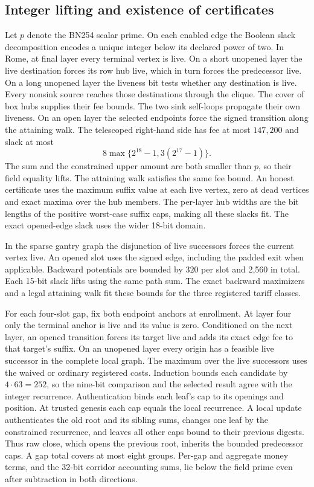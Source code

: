 \subsection{Integer lifting and existence of certificates}
Let $p$ denote the BN254 scalar prime. On each enabled edge the Boolean slack decomposition encodes a unique integer below its declared power of two. In Rome, at final layer every terminal vertex is live. On a short unopened layer the live destination forces its row hub live, which in turn forces the predecessor live. On a long unopened layer the liveness bit tests whether any destination is live. Every nonsink source reaches those destinations through the clique. The cover of box hubs supplies their fee bounds. The two sink self-loops propagate their own liveness. On an open layer the selected endpoints force the signed transition along the attaining walk. The telescoped right-hand side has fee at most $147{,}200$ and slack at most
\[
8\max\{2^{18}-1,3(2^{17}-1)\}.
\]
The sum and the constrained upper amount are both smaller than $p$, so their field equality lifts. The attaining walk satisfies the same fee bound. An honest certificate uses the maximum suffix value at each live vertex, zero at dead vertices and exact maxima over the hub members. The per-layer hub widths are the bit lengths of the positive worst-case suffix caps, making all these slacks fit. The exact opened-edge slack uses the wider 18-bit domain.

In the sparse gantry graph the disjunction of live successors forces the current vertex live. An opened slot uses the signed edge, including the padded exit when applicable. Backward potentials are bounded by $320$ per slot and 2,560 in total. Each 15-bit slack lifts using the same path sum. The exact backward maximizers and a legal attaining walk fit these bounds for the three registered tariff classes.

For each four-slot gap, fix both endpoint anchors at enrollment. At layer four only the terminal anchor is live and its value is zero. Conditioned on the next layer, an opened transition forces its target live and adds its exact edge fee to that target's suffix. On an unopened layer every origin has a feasible live successor in the complete local graph. The maximum over the live successors uses the waived or ordinary registered costs. Induction bounds each candidate by $4\cdot63=252$, so the nine-bit comparison and the selected result agree with the integer recurrence. Authentication binds each leaf's cap to its openings and position. At trusted genesis each cap equals the local recurrence. A local update authenticates the old root and its sibling sums, changes one leaf by the constrained recurrence, and leaves all other caps bound to their previous digests. Thus raw close, which opens the previous root, inherits the bounded predecessor caps. A gap total covers at most eight groups. Per-gap and aggregate money terms, and the 32-bit corridor accounting sums, lie below the field prime even after subtraction in both directions.

